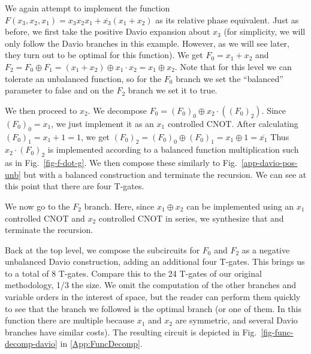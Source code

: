 \begin{example}
  \label{ex-davio}
    We again attempt to implement the function $F(x_3,x_2,x_1) = x_3x_2x_1 + \overline{x_3}(x_1 + x_2)$ as its relative phase equivalent.
    Just as before, we first take the positive Davio expansion about $x_3$ (for simplicity, we will only follow the Davio branches
  in this example. However, as  we will see later, they turn out to be optimal for this function). We get $F_0 = x_1 + x_2$ and
  $F_2 = F_0 \oplus F_1 = (x_1 + x_2) \oplus x_1 \cdot x_2 = x_1 \oplus x_2$. Note that for this level we can tolerate an unbalanced
  function, so for the $F_0$ branch we set the ``balanced'' parameter to false and on the $F_2$ branch we set it to true.

  We then proceed to $x_2$. We decompose $F_0 = (F_0)_0 \oplus x_2 \cdot ((F_0)_2)$. Since $(F_0)_0 = x_1$, we just implement it as an $x_1$
  controlled CNOT. After calculating $(F_0)_1 = x_1 + 1 = 1$, we get $(F_0)_2 = (F_0)_0 \oplus (F_0)_1 = x_1 \oplus 1 = \overline{x_1}$
  Thus $x_2 \cdot (F_0)_2$ is implemented according to a balanced function multiplication such as in Fig.~\ref{fig-f-dot-g}. We then compose
  these similarly to Fig.~\ref{app-davio-pos-unb} but with a balanced construction and terminate the recursion. We can see at this point that
  there are four T-gates.

  We now go to the $F_2$ branch. Here, since $x_1 \oplus x_2$ can be implemented using an $x_1$ controlled CNOT and $x_2$ controlled CNOT
  in series, we synthesize that and terminate the recursion.

  Back at the top level, we compose the subcircuits for $F_0$ and $F_2$ as a negative unbalanced Davio construction, adding an additional four
  T-gates. This brings us to a total of 8 T-gates. Compare this to the 24 T-gates of our original methodology, 1/3 the size. We omit
  the computation of the other branches and variable orders in the interest of space, but the reader can perform them  quickly to
  see that the branch we followed is the optimal branch (or one of them. In this function there are multiple because $x_1$  and
  $x_2$ are symmetric, and several Davio branches have similar costs). 
  The resulting circuit is depicted in Fig.~\ref{fig-func-decomp-davio} in \ref{App:FuncDecomp}.

\end{example}

